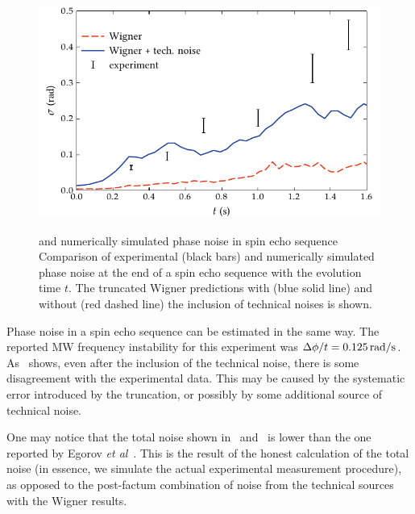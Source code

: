 \begin{figure}
    \centerline{\includegraphics{figures_generated/bec_noise/echo_noise.pdf}}

    \captionExperimental and numerically simulated phase noise in spin echo sequence{
    Comparison of experimental (black bars) and numerically simulated phase noise at the end of a spin echo sequence with the evolution time $t$.
    The truncated Wigner predictions with (blue solid line) and without (red dashed line) the inclusion of technical noises is shown.}%

    \label{fig:bec-noise:phase-noise:echo-phnoise}
\end{figure}

Phase noise in a spin echo sequence can be estimated in the same way.
The reported MW frequency instability for this experiment was $\Delta \phi / t = 0.125\mbox{\ensuremath{\,\mathrm{rad/s}}}$.
As~ shows, even after the inclusion of the technical noise, there is some disagreement with the experimental data.
This may be caused by the systematic error introduced by the truncation, or possibly by some additional source of technical noise.

One may notice that the total noise shown in~ and~ is lower than the one reported by Egorov \textit{et al}~\cite{Egorov2011,Egorov2012}.
This is the result of the honest calculation of the total noise (in essence, we simulate the actual experimental measurement procedure), as opposed to the post-factum combination of noise from the technical sources with the Wigner results.
